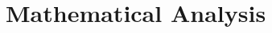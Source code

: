 \documentclass[journal, 11pt, a4paper, twoside]{IEEEtran}
\begin{document}
    
    
\section{Mathematical Analysis}
\end{document}
